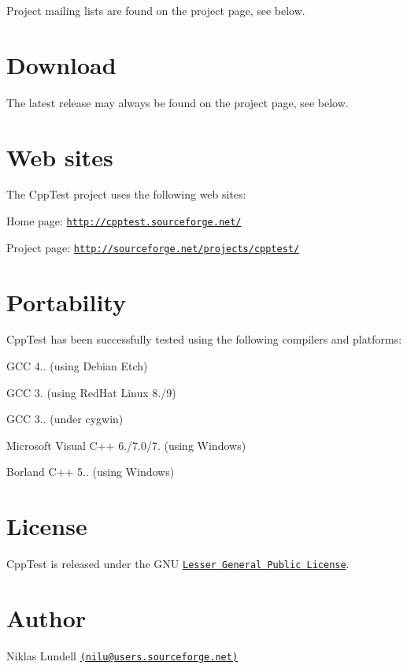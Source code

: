 Project mailing lists are found on the project page, see below.\hypertarget{index_main_download}{}\section{Download}\label{index_main_download}
The latest release may always be found on the project page, see below.\hypertarget{index_main_web_sites}{}\section{Web sites}\label{index_main_web_sites}
The Cpp\+Test project uses the following web sites\+:
\begin{DoxyItemize}
\item Home page\+: \href{http://cpptest.sourceforge.net/}{\tt http\+://cpptest.\+sourceforge.\+net/}
\item Project page\+: \href{http://sourceforge.net/projects/cpptest/}{\tt http\+://sourceforge.\+net/projects/cpptest/}
\end{DoxyItemize}\hypertarget{index_main_portability}{}\section{Portability}\label{index_main_portability}
Cpp\+Test has been successfully tested using the following compilers and platforms\+:
\begin{DoxyItemize}
\item G\+CC 4.. (using Debian Etch)
\item G\+CC 3. (using Red\+Hat Linux 8./9)
\item G\+CC 3.. (under cygwin)
\item Microsoft Visual C++ 6./7.0/7. (using Windows)
\item Borland C++ 5.. (using Windows)
\end{DoxyItemize}\hypertarget{index_main_license}{}\section{License}\label{index_main_license}
Cpp\+Test is released under the G\+NU \href{http://www.gnu.org/copyleft/lesser.html}{\tt Lesser General Public License}.\hypertarget{index_Author}{}\section{Author}\label{index_Author}

\begin{DoxyItemize}
\item Niklas Lundell \href{mailto:nilu@users.sourceforge.net}{\tt (nilu@users.\+sourceforge.\+net)} 
\end{DoxyItemize}